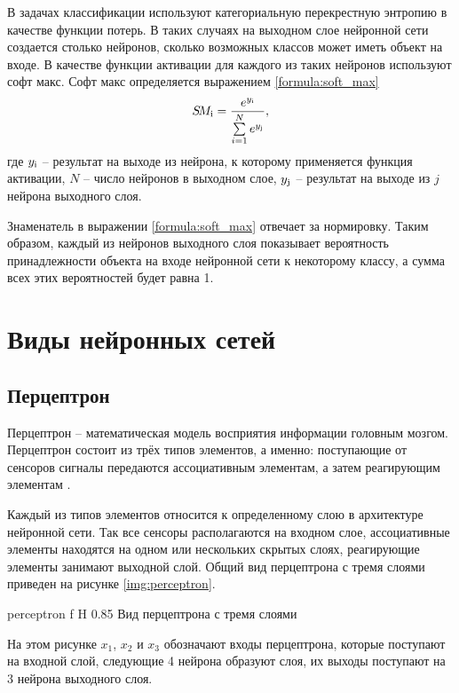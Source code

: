 В задачах классификации используют категориальную перекрестную энтропию в качестве функции потерь. В таких случаях на выходном слое нейронной сети создается столько нейронов, сколько возможных классов может иметь объект на входе. В качестве функции активации для каждого из таких нейронов используют софт макс. Софт макс определяется выражением \ref{formula:soft_max}
\begin{equation}\label{formula:soft_max}
S\!M_{\rm{i}} = \frac{e^{y_{\rm{i}}}}{\sum\limits_{i = 1}^{N}e^{y_{\rm{j}}}},
\end{equation}
где $y_{\rm{i}}$ -- результат на выходе из нейрона, к которому применяется функция активации, $N$ -- число нейронов в выходном слое, $y_{\rm{j}}$ -- результат на выходе из $j$ нейрона выходного слоя.

Знаменатель в выражении \ref{formula:soft_max} отвечает за нормировку. Таким образом, каждый из нейронов выходного слоя показывает вероятность принадлежности объекта на входе нейронной сети к некоторому классу, а сумма всех этих вероятностей будет равна 1.

\section{Виды нейронных сетей}

\subsection{Перцептрон}
Перцептрон – математическая модель восприятия информации головным мозгом. Перцептрон состоит из трёх типов элементов, а именно: поступающие от сенсоров сигналы передаются ассоциативным элементам, а затем реагирующим элементам \cite{perceptron}.

Каждый из типов элементов относится к определенному слою в архитектуре нейронной сети. Так все сенсоры располагаются на входном слое, ассоциативные элементы находятся на одном или нескольких скрытых слоях, реагирующие элементы занимают выходной слой. Общий вид перцептрона с тремя слоями приведен на рисунке \ref{img:perceptron}.

{perceptron} %
{f} %
{H} %
{0.85\textwidth} %
{Вид перцептрона с тремя слоями} %

На этом рисунке $x_1$, $x_2$ и $x_3$ обозначают входы перцептрона, которые поступают на входной слой, следующие 4 нейрона образуют слоя, их выходы поступают на 3 нейрона выходного слоя.

